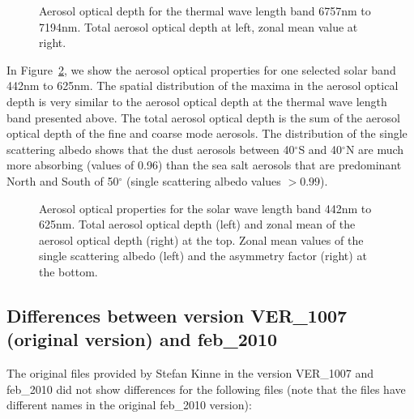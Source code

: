 \begin{appendix}
\begin{figure}[ht]
\vspace{-4cm}
\pcttwo
{}
{\hspace{-0cm}}
\caption{Aerosol optical depth for the thermal wave length band 6757nm
  to 7194nm. Total aerosol optical depth at left, zonal mean value at
  right.}\label{figaodlwkinne} 
\end{figure}

In Figure~\ref{figaodswkinne}, we show the aerosol optical properties
for one selected solar band 442nm to 625nm. The spatial distribution
of the maxima in the aerosol optical depth is very similar to the
aerosol optical depth at the thermal wave length band presented
above. The total aerosol optical depth is the sum of the aerosol
optical depth of the fine and coarse mode aerosols.
The distribution of the single scattering albedo shows that the
dust aerosols between 40$^\circ$S and 40$^\circ$N are much more
absorbing (values of 0.96) than the sea salt aerosols that are
predominant North and South of 50$^\circ$ (single scattering albedo
values $>0.99$). 

\begin{figure}[ht]
\vspace{-5cm}
\pctfour
{\vspace{-2cm}}
{\vspace{-2cm}\hspace{-0cm}}
{}
{\hspace{-0cm}}
\caption{Aerosol optical properties for the solar wave length band
  442nm to 625nm. Total aerosol optical depth (left) and zonal mean of
  the aerosol optical depth (right) at the top. Zonal mean values of
  the single scattering albedo (left) and the asymmetry factor (right)
  at the bottom.}\label{figaodswkinne}
\end{figure}

\subsection{Differences between version VER\_1007 (original version)
  and feb\_2010}

The original files provided by Stefan Kinne in the version VER\_1007
and feb\_2010 did not show differences for the following files (note that
the files have different names in the original feb\_2010 version):


\end{appendix}
